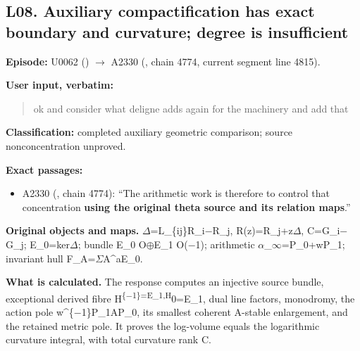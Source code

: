 \documentclass[10pt,a4paper,oneside]{report}
\providecommand{\tightlist}{\setlength{\itemsep}{0pt}\setlength{\parskip}{0pt}}
\begin{document}
\subsection{L08. Auxiliary compactification has exact boundary and
curvature; degree is
insufficient}\label{l08.-auxiliary-compactification-has-exact-boundary-and-curvature-degree-is-insufficient}

\textbf{Episode:} U0062
(\protect{})
\allowbreak{}\ensuremath{→}\allowbreak{} A2330
(\protect{}, chain 4774,
current segment line 4815).

\textbf{User input, verbatim:}

\begin{quote}
ok and consider what deligne adds again for the machinery and add that
\end{quote}

\textbf{Classification:} completed auxiliary geometric comparison;
source nonconcentration unproved.

\textbf{Exact passages:}

\begin{itemize}
\tightlist
\item
  A2330 (\protect{}, chain
  4774): ``The arithmetic work is therefore to control that
  concentration \textbf{using the original theta source and its relation
  maps}.''
\end{itemize}

\textbf{Original objects and maps.}
\allowbreak{}\ensuremath{Δ}\allowbreak{}=L\_\{ij\}R\_i\allowbreak{}\ensuremath{−}\allowbreak{}R\_j,
R(z)=R\_j+z\allowbreak{}\ensuremath{Δ}\allowbreak{},
C=G\_i\allowbreak{}\ensuremath{−}\allowbreak{}G\_j;
E\_0=ker\allowbreak{}\ensuremath{Δ}\allowbreak{}; bundle E\_0
O\allowbreak{}\ensuremath{⊕}\allowbreak{}E\_1
O(\allowbreak{}\ensuremath{−}\allowbreak{}1); arithmetic
\allowbreak{}\ensuremath{α}\allowbreak{}\_\allowbreak{}\ensuremath{∞}\allowbreak{}=P\_0+wP\_1;
invariant hull
F\_A=\allowbreak{}\ensuremath{Σ}\allowbreak{}A\textasciicircum{}aE\_0.

\textbf{What is calculated.} The response computes an injective source
bundle, exceptional derived fibre
H\textsuperscript{\{\allowbreak{}\ensuremath{−}\allowbreak{}1\}=E\_1,H}0=E\_1,
dual line factors, monodromy, the action pole
w\textasciicircum{}\{\allowbreak{}\ensuremath{−}\allowbreak{}1\}P\_1AP\_0,
its smallest coherent A-stable enlargement, and the retained metric
pole. It proves the log-volume equals the logarithmic curvature
integral, with total curvature rank C.
\end{document}
